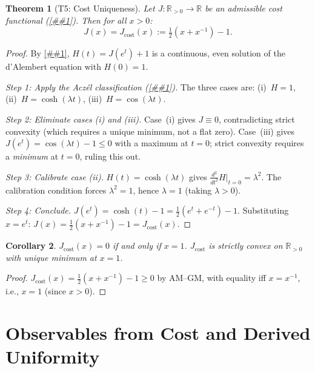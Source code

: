 \documentclass[11pt]{article}
\providecommand{\cref}[1]{\ref{##1}}%
\newcommand{\R}{\mathbb{R}}
\newcommand{\Rp}{\mathbb{R}_{>0}}
\newcommand{\Jcost}{J_{\mathrm{cost}}}
\newtheorem{theorem}{Theorem}[section]
\newtheorem{corollary}[theorem]{Corollary}
\theoremstyle{definition}
\theoremstyle{remark}
\begin{document}
\begin{theorem}[T5: Cost Uniqueness]\label{thm:t5}
Let $J : \Rp \to \R$ be an admissible cost functional
(\cref{def:admissible-cost}).
Then for all $x > 0$:
\begin{equation}\label{eq:jcost}
J(x) = \Jcost(x) := \tfrac{1}{2}(x + x^{-1}) - 1.
\end{equation}
\end{theorem}

\begin{proof}
By \cref{prop:dalembert-equiv}, $H(t) = J(e^t) + 1$ is a
continuous, even solution of the d'Alembert equation with
$H(0) = 1$.

\emph{Step 1: Apply the Acz\'el classification
(\cref{thm:aczel}).}
The three cases are: (i)~$H = 1$, (ii)~$H = \cosh(\lambda t)$,
(iii)~$H = \cos(\lambda t)$.

\emph{Step 2: Eliminate cases (i) and (iii).}
Case~(i) gives $J \equiv 0$, contradicting strict convexity
(which requires a unique minimum, not a flat zero).
Case~(iii) gives $J(e^t) = \cos(\lambda t) - 1 \leq 0$
with a maximum at $t = 0$;
strict convexity requires a \emph{minimum} at $t = 0$, ruling
this out.

\emph{Step 3: Calibrate case (ii).}
$H(t) = \cosh(\lambda t)$ gives
$\frac{d^2}{dt^2} H\big|_{t=0} = \lambda^2$.
The calibration condition forces $\lambda^2 = 1$,
hence $\lambda = 1$ (taking $\lambda > 0$).

\emph{Step 4: Conclude.}
$J(e^t) = \cosh(t) - 1 = \frac{1}{2}(e^t + e^{-t}) - 1$.
Substituting $x = e^t$:
$J(x) = \frac{1}{2}(x + x^{-1}) - 1 = \Jcost(x)$.
\end{proof}

\begin{corollary}\label{cor:unique-min}
$\Jcost(x) = 0$ if and only if $x = 1$.
$\Jcost$ is strictly convex on $\Rp$ with unique minimum at $x = 1$.
\end{corollary}
\begin{proof}
$\Jcost(x) = \frac{1}{2}(x + x^{-1}) - 1 \geq 0$ by AM--GM,
with equality iff $x = x^{-1}$, i.e., $x = 1$ (since $x > 0$).
\end{proof}

\section{Observables from Cost and Derived Uniformity}
\label{sec:obs-cost}
\end{document}
